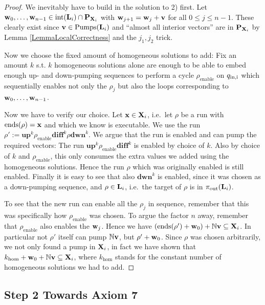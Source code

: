 \begin{proof}
We inevitably have to build in the solution to 2) first. Let \(\mathbf{w}_0, \dots, \mathbf{w}_{n-1} \in \operatorname{int}(\mathbf{L}_i) \cap \mathbf{P}_{\mathbf{X}_i}\) with \(\mathbf{w}_{j+1}=\mathbf{w}_j+\mathbf{v}\) for all \(0 \leq j \leq n-1\). These clearly exist since \(\mathbf{v} \in \operatorname{Pumps}(\mathbf{L}_i)\) and ``almost all interior vectors'' are in \(\mathbf{P}_{\mathbf{X}_i}\) by Lemma \ref{LemmaLocalCorrectness} and the \(j_1, j_2\) trick.

Now we choose the fixed amount of homogeneous solutions to add: Fix an amount \(k\) s.t. \(k\) homogeneous solutions alone are enough to be able to embed enough up- and down-pumping sequences to perform a cycle \(\rho_{\text{enable}}\) on \(q_{\text{in,i}}\) which sequentially enables not only the \(\rho_j\) but also the loops corresponding to \(\mathbf{w}_0, \dots, \mathbf{w}_{n-1}\).

Now we have to verify our choice. Let \(\mathbf{x} \in \mathbf{X}_i\), i.e.\ let \(\rho\) be a run with \(\operatorname{ends}(\rho)=\mathbf{x}\) and which we know is executable. We use the run \(\rho':=\mathbf{up}^k  \rho_{\text{enable}} \mathbf{diff}^k \rho \mathbf{dwn}^k \). We argue that the run is enabled and can pump the required vectors: The run \(\mathbf{up}^k \rho_{\text{enable}} \mathbf{diff}^k\) is enabled by choice of \(k\). Also by choice of \(k\) and \(\rho_{\text{enable}}\), this only consumes the extra values we added using the homogeneous solutions. Hence the run \(\rho\) which was originally enabled is still enabled. Finally it is easy to see that also \(\mathbf{dwn}^k\) is enabled, since it was chosen as a down-pumping sequence, and \(\rho \in \mathbf{L}_i\), i.e.\ the target of \(\rho\) is in \(\pi_{\text{out}}(\mathbf{L}_i)\).

To see that the new run can enable all the \(\rho_j\) in sequence, remember that this was specifically how \(\rho_{\text{enable}}\) was chosen. To argue the factor \(n\) away, remember that \(\rho_{\text{enable}}\) also enables the \(\mathbf{w}_j\). Hence we have \((\operatorname{ends}(\rho')+\mathbf{w}_0)+\mathbb{N} \mathbf{v} \subseteq \mathbf{X}_i\). In particular not \(\rho'\) itself can pump \(\mathbb{N} \mathbf{v}\), but \(\rho'+\mathbf{w}_0\). Since \(\rho\) was chosen arbitrarily, we not only found a pump in \(\mathbf{X}_i\), in fact we have shown that \(k_{\text{hom}}+\mathbf{w}_0+\mathbb{N} \mathbf{v} \subseteq \mathbf{X}_i\), where \(k_{\text{hom}}\) stands for the constant number of homogeneous solutions we had to add.
\end{proof}

\subsection{Step 2 Towards Axiom 7}

